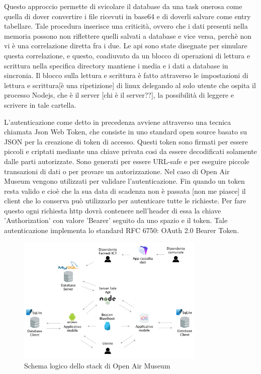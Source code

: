   Questo approccio permette di svicolare il database da una task onerosa come quella di dover convertire i file ricevuti in base64 e di doverli salvare come entry tabellare. Tale procedura inserisce una criticità, ovvero che i dati presenti nella memoria possono non riflettere quelli salvati a database e vice versa, perchè non vi è una correlazione diretta fra i due. Le api sono state disegnate per simulare questa correlazione, e questo, coadiuvato da un blocco di operazioni di lettura e scrittura nella specifica directory mantiene i media e i dati a database in sincronia. Il blocco sulla lettura e scrittura è fatto attraverso le impostazioni di lettura e scrittura[è una ripetizione] di linux delegando al solo utente che ospita il processo Nodejs, che è il server [chi è il server??], la possibilità di leggere e scrivere in tale cartella.\vspace{5mm}

L'autenticazione come detto in precedenza avviene attraverso una tecnica chiamata Json Web Token\cite{JWT}, che consiste in uno standard open source basato su JSON per la creazione di token di accesso. Questi token sono firmati per essere piccoli e criptati mediante una chiave privata cosi da essere decodificati solamente dalle parti autorizzate. Sono generati per essere URL-safe e per eseguire piccole transazioni di dati o per provare un autorizzazione. Nel caso di Open Air Museum vengono utilizzati per validare l'autenticazione. Fin quando un token resta valido e cioè che la sua data di scadenza non è passata [non me piasce] il client che lo conserva può utilizzarlo per autenticare tutte le richieste. Per fare questo ogni richiesta http dovrà contenere nell'header di essa la chiave 'Authorization' con valore 'Bearer' seguito da uno spazio e il token. Tale autenticazione implementa lo standard RFC 6750: OAuth 2.0 Bearer Token\cite{Bearer}.

\begin{figure}[h]
\centering
\includegraphics[width=0.8\textwidth]{images/SchemaOpenAirMuseum.png}
\caption{Schema logico dello stack di Open Air Museum}
\end{figure}

